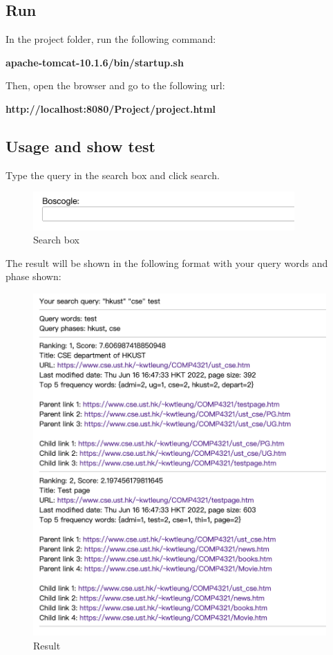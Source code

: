 \documentclass{article}
\begin{document}
        \newpage
        \subsection*{Run}
            In the project folder, run the following command: \\[0.4em]
            \centerline{\textbf{apache-tomcat-10.1.6/bin/startup.sh}}
            Then, open the browser and go to the following url: \\[0.4em]
            \centerline{\textbf{http://localhost:8080/Project/project.html}}

        \subsection*{Usage and show test}
        Type the query in the search box and click search.
        \begin{figure}[!htbp]
            \centering
            \includegraphics[width=10cm]{search.png}
            \caption{Search box}
        \end{figure}

        The result will be shown in the following format with your query words and phase shown:
        \begin{figure}[!htbp]
            \centering
            \includegraphics[width=14cm]{example1.png}
            \caption{Result}
        \end{figure}
\end{document}
